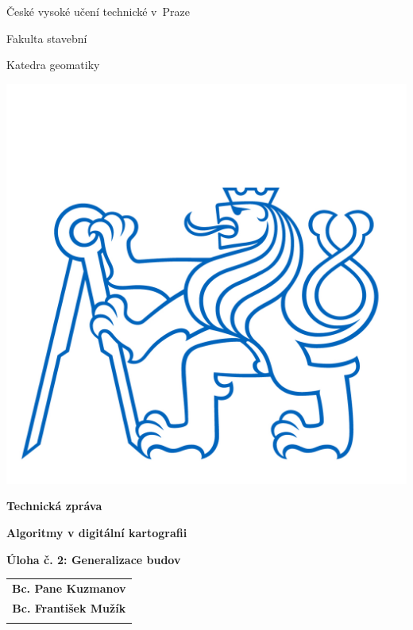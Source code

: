\documentclass[a4paper, 12pt, oneside, titlepage]{article} %
\begin{document}
\setcounter{page}{1}   %
\thispagestyle{empty}

\begin{center}

\large

\v{C}eské vysoké učení technické v~Praze

\medskip

Fakulta stavební
\medskip

Katedra geomatiky

\vfill
\centerline{\mbox{\includegraphics[scale=1.3]{obrazky/symbol_cvut_konturova_verze.jpg}} }


{\bf\Large Technická zpráva}

\vfill

{\bf\LARGE\bfseries Algoritmy v digitální kartografii}

\vfill

{\bf\Large Úloha č. 2: Generalizace budov}


\vfill



\vfill
\vspace{5mm}

\begin{tabular}{c}

{\bf Bc. Pane Kuzmanov}\\
\noalign{\vspace{2mm}}
{\bf Bc. František Mužík}\\
\noalign{\vspace{10mm}}


\end{tabular}
\end{center}
\end{document}
